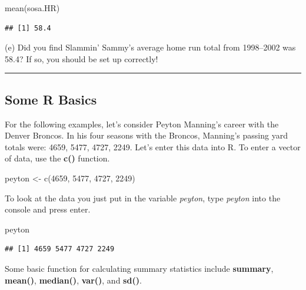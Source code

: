 \documentclass[
]{book}
\newenvironment{Shaded}{\begin{snugshade}}{\end{snugshade}}
\newcommand{\DecValTok}[1]{\textcolor[rgb]{0.00,0.00,0.81}{#1}}
\newcommand{\FunctionTok}[1]{\textcolor[rgb]{0.00,0.00,0.00}{#1}}
\newcommand{\NormalTok}[1]{#1}
\newcommand{\OtherTok}[1]{\textcolor[rgb]{0.56,0.35,0.01}{#1}}
\theoremstyle{definition}
\theoremstyle{definition}
\theoremstyle{definition}
\theoremstyle{definition}
\theoremstyle{remark}
\begin{document}
\begin{Shaded}
\begin{Highlighting}[]
\FunctionTok{mean}\NormalTok{(sosa.HR)}
\end{Highlighting}
\end{Shaded}

\begin{verbatim}
## [1] 58.4
\end{verbatim}

\noindent (e) Did you find Slammin' Sammy's average home run total from 1998--2002 was 58.4? If so, you should be set up correctly!

\begin{center}\rule{0.5\linewidth}{0.5pt}\end{center}

\hypertarget{some-r-basics}{%
\subsection{Some R Basics}\label{some-r-basics}}

For the following examples, let's consider Peyton Manning's career with the Denver Broncos. In his four seasons with the Broncos, Manning's passing yard totals were: 4659, 5477, 4727, 2249. Let's enter this data into R. To enter a vector of data, use the \textbf{c()} function.

\begin{Shaded}
\begin{Highlighting}[]
\NormalTok{peyton }\OtherTok{\textless{}{-}} \FunctionTok{c}\NormalTok{(}\DecValTok{4659}\NormalTok{, }\DecValTok{5477}\NormalTok{, }\DecValTok{4727}\NormalTok{, }\DecValTok{2249}\NormalTok{)}
\end{Highlighting}
\end{Shaded}

To look at the data you just put in the variable \emph{peyton}, type \emph{peyton} into the console and press enter.

\begin{Shaded}
\begin{Highlighting}[]
\NormalTok{peyton}
\end{Highlighting}
\end{Shaded}

\begin{verbatim}
## [1] 4659 5477 4727 2249
\end{verbatim}

Some basic function for calculating summary statistics include \textbf{summary}, \textbf{mean()}, \textbf{median()}, \textbf{var()}, and \textbf{sd()}.
\end{document}
